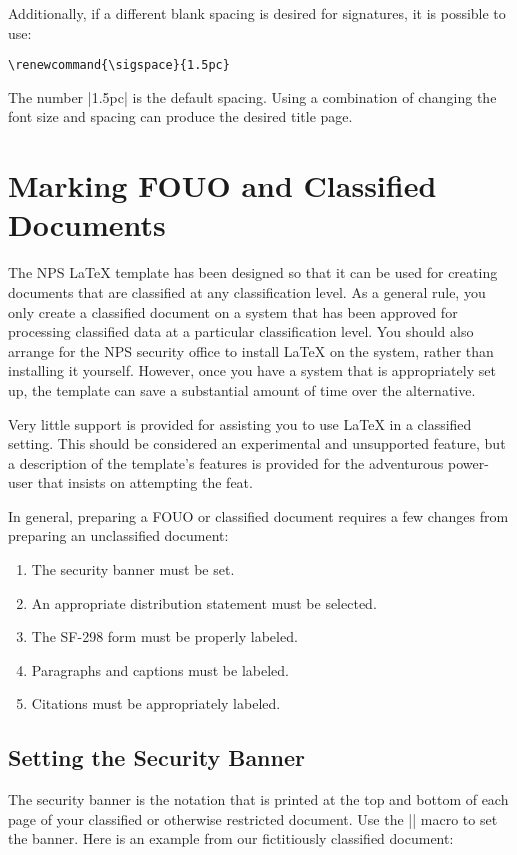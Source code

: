 Additionally, if a different blank spacing is desired for signatures, it is possible to use:

\begin{Verbatim}
\renewcommand{\sigspace}{1.5pc}
\end{Verbatim}

The number |1.5pc| is the default spacing.  Using a combination of changing the font size and spacing can produce the desired title page.

\section{Marking FOUO and Classified Documents}\label{sec:classified}
The NPS \LaTeX{} template has been designed so that it can be used
for creating documents that are 
classified at any classification level. As a general rule, you only
create a classified document on a system that has been approved for
processing classified data at a particular classification level. You
should also arrange for the NPS security office to install \LaTeX{} on
the system, rather than installing it yourself. However, once you have
a system that is appropriately set up, the template can save a
substantial amount of time over the alternative.

Very little support is provided for assisting you to use \LaTeX{} in
a classified setting. This should be considered an experimental
and unsupported feature, but a description of the template's features is
provided for the adventurous power-user that insists
on attempting the feat.

In general, preparing a FOUO or classified document requires a few
changes from preparing an unclassified document:
\begin{enumerate}
\item The security banner must be set.
\item An appropriate distribution statement must be selected.
\item The SF-298 form must be properly labeled.
\item Paragraphs and captions must be labeled.
\item Citations must be appropriately labeled.
\end{enumerate}


\subsection{Setting the Security Banner}
The security banner is the notation that is printed at the top and
bottom of each page of your classified or otherwise restricted
document. Use the |\securitybanner{}| macro to set the banner. Here is
an example from our fictitiously classified document:

